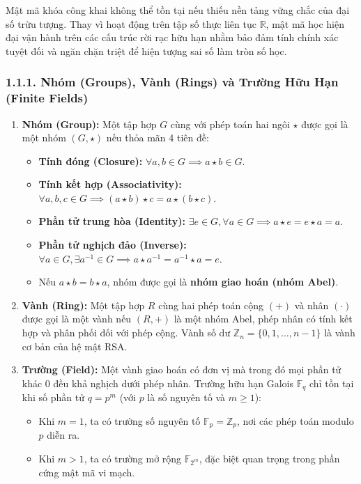 \documentclass[
]{article}
\providecommand{\tightlist}{%
  \setlength{\itemsep}{0pt}\setlength{\parskip}{0pt}}
\begin{document}
Mật mã khóa công khai không thể tồn tại nếu thiếu nền tảng vững chắc của
đại số trừu tượng. Thay vì hoạt động trên tập số thực liên tục
\(\mathbb{R}\), mật mã học hiện đại vận hành trên các cấu trúc rời rạc
hữu hạn nhằm bảo đảm tính chính xác tuyệt đối và ngăn chặn triệt để hiện
tượng sai số làm tròn số học.

\subsubsection{1.1.1. Nhóm (Groups), Vành (Rings) và Trường Hữu Hạn
(Finite
Fields)}\label{nhuxf3m-groups-vuxe0nh-rings-vuxe0-trux1b0ux1eddng-hux1eefu-hux1ea1n-finite-fields}

\begin{enumerate}
\def\labelenumi{\arabic{enumi}.}
\item
  \textbf{Nhóm (Group):} Một tập hợp \(G\) cùng với phép toán hai ngôi
  \(\star\) được gọi là một nhóm \((G, \star)\) nếu thỏa mãn 4 tiên đề:

  \begin{itemize}
  \tightlist
  \item
    \textbf{Tính đóng (Closure):}
    \(\forall a, b \in G \implies a \star b \in G\).
  \item
    \textbf{Tính kết hợp (Associativity):}
    \(\forall a, b, c \in G \implies (a \star b) \star c = a \star (b \star c)\).
  \item
    \textbf{Phần tử trung hòa (Identity):}
    \(\exists e \in G, \forall a \in G \implies a \star e = e \star a = a\).
  \item
    \textbf{Phần tử nghịch đảo (Inverse):}
    \(\forall a \in G, \exists a^{-1} \in G \implies a \star a^{-1} = a^{-1} \star a = e\).
  \item
    Nếu \(a \star b = b \star a\), nhóm được gọi là \textbf{nhóm giao
    hoán (nhóm Abel)}.
  \end{itemize}
\item
  \textbf{Vành (Ring):} Một tập hợp \(R\) cùng hai phép toán cộng
  \((+)\) và nhân \((\cdot)\) được gọi là một vành nếu \((R, +)\) là một
  nhóm Abel, phép nhân có tính kết hợp và phân phối đối với phép cộng.
  Vành số dư \(\mathbb{Z}_n = \{0, 1, \dots, n-1\}\) là vành cơ bản của
  hệ mật RSA.
\item
  \textbf{Trường (Field):} Một vành giao hoán có đơn vị mà trong đó mọi
  phần tử khác 0 đều khả nghịch dưới phép nhân. Trường hữu hạn Galois
  \(\mathbb{F}_q\) chỉ tồn tại khi số phần tử \(q = p^m\) (với \(p\) là
  số nguyên tố và \(m \ge 1\)):

  \begin{itemize}
  \tightlist
  \item
    Khi \(m = 1\), ta có trường số nguyên tố
    \(\mathbb{F}_p = \mathbb{Z}_p\), nơi các phép toán modulo \(p\) diễn
    ra.
  \item
    Khi \(m > 1\), ta có trường mở rộng \(\mathbb{F}_{2^m}\), đặc biệt
    quan trọng trong phần cứng mật mã vi mạch.
  \end{itemize}
\end{enumerate}
\end{document}
